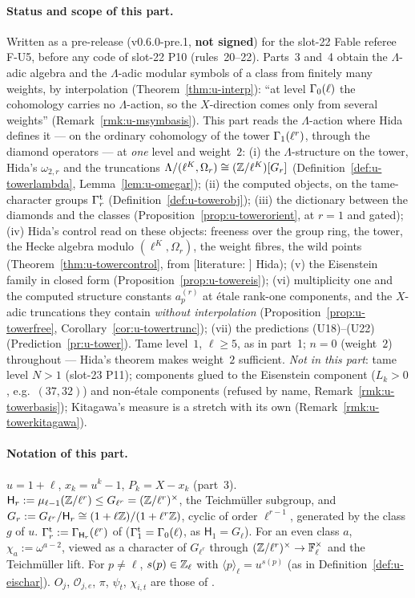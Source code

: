 \documentclass[11pt]{article}
\newcommand{\LIT}[1]{\textsf{[literature: #1]}}   %
\newcommand{\Iw}{\Lambda}                         %
\newcommand{\Pk}[1]{P_{#1}}                       %
\newcommand{\Zl}{\Z_\ell}
\newcommand{\GaT}[1]{\Ga^{\mathrm t}_{#1}}            %
\newcommand{\Om}[1]{\Omega_{#1}}                      %
\begin{document}
\paragraph{Status and scope of this part.} Written as a pre-release (v0.6.0-pre.1, \textbf{not signed}) for the slot-22 Fable referee F-U5, before any code of slot-22 P10
(rules~20--22). Parts~3 and~4 obtain the $\Iw$-adic algebra and the $\Iw$-adic modular symbols of a class from finitely many weights, by interpolation
(Theorem~\ref{thm:u-interp}): ``at level $\Gamma_0(\ell)$ the cohomology carries no $\Iw$-action, so the $X$-direction comes only from several weights'' (Remark~\ref{rmk:u-msymbasis}).
This part reads the $\Iw$-action where Hida defines it --- on the ordinary cohomology of the tower $\Gamma_1(\ell^{r})$, through the diamond operators --- at \emph{one} level and weight~$2$:
(i) the $\Iw$-structure on the tower, Hida's $\omega_{2,r}$ and the truncations $\Iw/(\ell^{K},\Om r)\cong(\Z/\ell^{K})[G_r]$ (Definition~\ref{def:u-towerlambda},
Lemma~\ref{lem:u-omegar}); (ii) the computed objects, on the tame-character groups $\GaT r$ (Definition~\ref{def:u-towerobj}); (iii) the dictionary between the diamonds and the classes
(Proposition~\ref{prop:u-towerorient}, \COMP{} at $r=1$ and gated); (iv) Hida's control read on these objects: freeness over the group ring, the tower, the Hecke algebra modulo
$(\ell^{K},\Om r)$, the weight fibres, the wild points (Theorem~\ref{thm:u-towercontrol}, \PROVED{} from \LIT{} Hida); (v) the Eisenstein family in closed form
(Proposition~\ref{prop:u-towereis}); (vi) multiplicity one and the computed structure constants $a_p^{(r)}$ at étale rank-one components, and the $X$-adic truncations they contain
\emph{without interpolation} (Proposition~\ref{prop:u-towerfree}, Corollary~\ref{cor:u-towertrunc}); (vii) the predictions (U18)--(U22) (Prediction~\ref{pr:u-tower}). Tame level~$1$,
$\ell\ge5$, as in part~1; $n=0$ (weight~$2$) throughout --- Hida's theorem makes weight~$2$ sufficient. \emph{Not in this part}: tame level $N>1$ (slot-23 P11); components glued to the
Eisenstein component ($L_k>0$, e.g.\ $(37,32)$) and non-étale components (refused by name, Remark~\ref{rmk:u-towerbasis}); Kitagawa's measure is a stretch with its own \CONJ{}
(Remark~\ref{rmk:u-towerkitagawa}).

\paragraph{Notation of this part.} $u=1+\ell$, $x_k=u^{k}-1$, $\Pk k=X-x_k$ (part~3). $\mathsf H_r:=\mu_{\ell-1}(\mathbb{Z}/\ell^{r})\le G_{\ell^{r}}=(\mathbb{Z}/\ell^{r})^{\times}$, the Teichm\"uller subgroup,
and $G_r:=G_{\ell^{r}}/\mathsf H_r\cong(1+\ell\mathbb{Z})/(1+\ell^{r}\mathbb{Z})$, cyclic of order $\ell^{r-1}$, generated by the class $g$ of $u$. $\GaT r:=\Ga_{\mathsf H_r}(\ell^{r})$ of 
($\GaT1=\Ga_0(\ell)$, as $\mathsf H_1=G_\ell$). For an even class $a$, $\chi_a:=\omega^{a-2}$, viewed as a character of $G_{\ell^{r}}$ through $(\mathbb{Z}/\ell^{r})^{\times}\to\mathbb{F}_\ell^{\times}$ and the
Teichm\"uller lift. For $p\ne\ell$, $s(p)\in\Zl$ with $\langle p\rangle_\ell=u^{s(p)}$ (as in Definition~\ref{def:u-eischar}). $O_j$, $\mathcal O_{j,e}$, $\pi$, $\psi_t$, $\chi_{i,t}$ are those of
.
\end{document}
